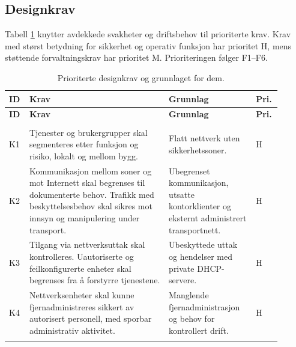 \subsection{Designkrav}
Tabell \ref{tab:designkrav} knytter avdekkede svakheter og driftsbehov til prioriterte krav. Krav med størst betydning for sikkerhet og operativ funksjon har prioritet H, mens støttende forvaltningskrav har prioritet M. Prioriteringen følger F1--F6.

\begingroup
\small
\setlength{\tabcolsep}{4pt}
\renewcommand{\arraystretch}{1.0}
\captionsetup{justification=centering,singlelinecheck=false}
\begin{longtable}{>{\raggedright\arraybackslash}p{0.055\linewidth} >{\raggedright\arraybackslash}p{0.48\linewidth} >{\raggedright\arraybackslash}p{0.30\linewidth} >{\centering\arraybackslash}p{0.065\linewidth}}
\caption{Prioriterte designkrav og grunnlaget for dem.}\label{tab:designkrav}\\
\toprule
\rowcolor{tablegreen}
\color{white}\textbf{ID} & \color{white}\textbf{Krav} & \color{white}\textbf{Grunnlag} & \color{white}\textbf{Pri.} \\
\midrule
\endfirsthead
\toprule
\rowcolor{tablegreen}
\color{white}\textbf{ID} & \color{white}\textbf{Krav} & \color{white}\textbf{Grunnlag} & \color{white}\textbf{Pri.} \\
\midrule
\endhead
\midrule
\multicolumn{4}{r}{Fortsetter på neste side}\\
\endfoot
\bottomrule
\endlastfoot
K1 & Tjenester og brukergrupper skal segmenteres etter funksjon og risiko, lokalt og mellom bygg. & Flatt nettverk uten sikkerhetssoner. & H \\
\addlinespace
K2 & Kommunikasjon mellom soner og mot Internett skal begrenses til dokumenterte behov. Trafikk med beskyttelsesbehov skal sikres mot innsyn og manipulering under transport. & Ubegrenset kommunikasjon, utsatte kontorklienter og eksternt administrert transportnett. & H \\
\addlinespace
K3 & Tilgang via nettverksuttak skal kontrolleres. Uautoriserte og feilkonfigurerte enheter skal begrenses fra å forstyrre tjenestene. & Ubeskyttede uttak og hendelser med private DHCP-servere. & H \\
\addlinespace
K4 & Nettverksenheter skal kunne fjernadministreres sikkert av autorisert personell, med sporbar administrativ aktivitet. & Manglende fjernadministrasjon og behov for kontrollert drift. & H \\
\addlinespace

\end{longtable}

